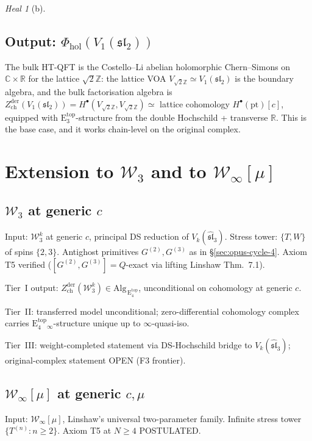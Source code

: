 \documentclass{article}
\theoremstyle{definition}
\theoremstyle{remark}
\newtheorem{heal}[theorem]{Heal}
\newcommand{\Phihol}{\Phi_{\mathrm{hol}}}
\newcommand{\Zder}{Z^{\mathrm{der}}_{\mathrm{ch}}}
\newcommand{\Etop}[1]{\mathrm{E}_{#1}^{\mathrm{top}}}
\newcommand{\cW}{\mathcal{W}}
\begin{document}
\begin{heal}[b]
\subsection{Output: $\Phihol(V_1(\mathfrak{sl}_2))$}
The bulk HT-QFT is the Costello--Li abelian holomorphic
Chern--Simons on $\mathbb{C} \times \mathbb{R}$ for the
lattice $\sqrt{2}\mathbb{Z}$: the lattice VOA
$V_{\sqrt{2}\mathbb{Z}} \simeq V_1(\mathfrak{sl}_2)$ is the
boundary algebra, and the bulk factorisation algebra is
$\Zder(V_1(\mathfrak{sl}_2)) =
H^\bullet(V_{\sqrt{2}\mathbb{Z}}, V_{\sqrt{2}\mathbb{Z}})
\simeq$ lattice cohomology $H^\bullet(\mathrm{pt})[c]$,
equipped with $\Etop{3}$-structure from the double
Hochschild + transverse $\mathbb{R}$. This is the base
case, and it works chain-level on the original complex.

\section{Extension to $\cW_3$ and to $\cW_\infty[\mu]$}
\label{sec:opus-wstack}

\subsection{$\cW_3$ at generic $c$}
Input: $\cW_3^k$ at generic $c$, principal DS reduction of
$V_k(\widehat{\mathfrak{sl}}_3)$. Stress tower:
$\{T, W\}$ of spins $\{2, 3\}$. Antighost primitives
$G^{(2)}, G^{(3)}$ as in \S\ref{sec:opus-cycle-4}. Axiom T5
verified ($[G^{(2)}, G^{(3)}] = Q$-exact via lifting
Linshaw Thm.~7.1).

Tier~I output: $\Zder(\cW_3^k) \in \mathrm{Alg}_{\,\Etop{4}}$,
unconditional on cohomology at generic $c$.

Tier~II: transferred model unconditional; zero-differential
cohomology complex carries $\Etop{4}_\infty$-structure
unique up to $\infty$-quasi-iso.

Tier~III: weight-completed statement via DS-Hochschild
bridge to $V_k(\widehat{\mathfrak{sl}}_3)$; original-complex
statement OPEN (F3 frontier).

\subsection{$\cW_\infty[\mu]$ at generic $c, \mu$}
Input: $\cW_\infty[\mu]$, Linshaw's universal two-parameter
family. Infinite stress tower
$\{T^{(n)} : n \ge 2\}$. Axiom T5 at $N \ge 4$ POSTULATED.


\end{heal}
\end{document}
